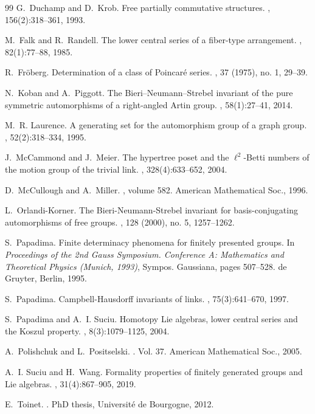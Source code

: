 \documentclass[10pt]{amsart}
\theoremstyle{definition}
\theoremstyle{definition}
\numberwithin{equation}{section}
\begin{document}
\begin{thebibliography}{99}
G.~Duchamp and D.~Krob.
\newblock Free partially commutative structures.
, 156(2):318--361, 1993.

M.~Falk and R.~Randell.
\newblock The lower central series of a fiber-type arrangement.
, 82(1):77--88, 1985.

R.~Fröberg.
\newblock Determination of a class of Poincaré series.
, 37 (1975), no. 1, 29–39.

N.~Koban and A.~Piggott.
\newblock The {Bieri--Neumann--Strebel} invariant of the pure symmetric
  automorphisms of a right-angled {Artin} group.
, 58(1):27--41, 2014.

M.~R. Laurence.
\newblock A generating set for the automorphism group of a graph group.
, 52(2):318--334,
  1995.

J.~McCammond and J.~Meier.
\newblock The hypertree poset and the {$\ell^2$-Betti} numbers of the motion
  group of the trivial link.
, 328(4):633--652, 2004.

D.~McCullough and A.~Miller.
, volume 582.
\newblock American Mathematical Soc., 1996.


L.~Orlandi-Korner.
\newblock The Bieri-Neumann-Strebel invariant for basis-conjugating automorphisms of free groups.
,  128 (2000), no. 5, 1257–1262.



S.~Papadima.
\newblock Finite determinacy phenomena for finitely presented groups.
\newblock In {\em Proceedings of the 2nd {G}auss {S}ymposium. {C}onference {A}:
  {M}athematics and {T}heoretical {P}hysics ({M}unich, 1993)}, Sympos.
  Gaussiana, pages 507--528. de Gruyter, Berlin, 1995.

S.~Papadima.
\newblock Campbell-{H}ausdorff invariants of links.
, 75(3):641--670, 1997.

S.~Papadima and A.~I. Suciu.
\newblock Homotopy Lie algebras, lower central series and the Koszul property.
, 8(3):1079--1125, 2004.


A.~Polishchuk and L.~Positselski.
.
\newblock Vol. 37. American Mathematical Soc., 2005.

A.~I. Suciu and H.~Wang.
\newblock Formality properties of finitely generated groups and {L}ie algebras.
, 31(4):867--905, 2019.

E.~Toinet.
.
\newblock PhD thesis, Universit{\'e} de Bourgogne, 2012.

\end{thebibliography}
\end{document}

